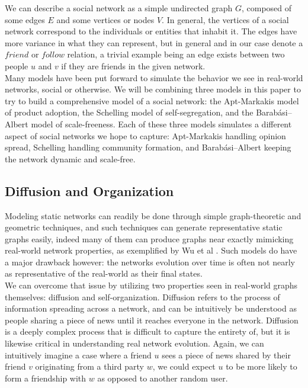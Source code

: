 \documentclass[12pt,twoside]{report}
\begin{document}
We can describe a social network as a simple undirected graph $G$, composed of some edges $E$ and some vertices or nodes $V$. In general, the vertices of a social network correspond to the individuals or entities that inhabit it. The edges have more variance in what they can represent, but in general and in our case denote a 
$friend$ or $follow$ relation, a trivial example being an edge exists between two people $u$ and $v$ if they are friends in the given network. \\

Many models have been put forward to simulate the behavior we see in real-world networks, social or otherwise. We will be combining three models in this paper to try to build a comprehensive model of a social network: the Apt-Markakis model of product adoption, the Schelling model of self-segregation, and the Barabási–Albert model of scale-freeness. Each of these three models simulates a different aspect of social networks we hope to capture: Apt-Markakis handling opinion spread, Schelling handling community formation, and Barabási–Albert keeping the network dynamic and scale-free. \\

\subsection{Diffusion and Organization}

Modeling static networks can readily be done through simple graph-theoretic and geometric techniques, and such techniques can generate representative static graphs easily, indeed many of them can produce graphs near exactly mimicking real-world network properties, as exemplified by Wu et al \cite{wu2015emergent}. Such models do have a major drawback however: the networks evolution over time is often not nearly as representative of the real-world as their final states. \\

We can overcome that issue by utilizing two properties seen in real-world graphs themselves: diffusion and self-organization. Diffusion refers to the process of information spreading across a network, and can be intuitively be understood as people sharing a piece of news until it reaches everyone in the network. Diffusion is a deeply complex process that is difficult to capture the entirety of, but it is likewise critical in understanding real network evolution. Again, we can intuitively imagine a case where a friend $u$ sees a piece of news shared by their friend $v$ originating from a third party $w$, we could expect $u$ to be more likely to form a friendship with $w$ as opposed to another random user. \\
\end{document}
